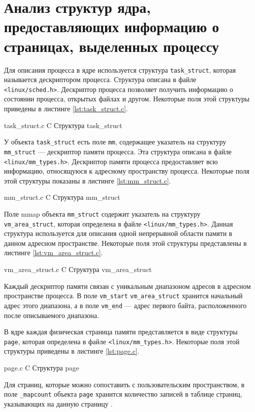 \section{Анализ структур ядра, предоставляющих информацию о страницах, выделенных процессу}

Для описания процесса в ядре используется структура \texttt{task\_struct}, которая называется дескриптором процесса. Структура описана в файле \texttt{<linux/sched.h>}. Дескриптор процесса позволяет получить информацию о состоянии процесса, открытых файлах и другом. Некоторые поля этой структуры приведены в листинге \ref{lst:task_struct.c}.

    {task_struct.c}
    {C}
    {Структура task\_struct}
    
У объекта \texttt{task\_struct} есть поле \texttt{mm}, содержащее указатель на структуру \texttt{mm\_struct} --- дескриптор памяти процесса. Эта структура описана в файле \texttt{<linux/mm\_types.h>}. Дескриптор памяти процесса предоставляет всю информацию, относящуюся к адресному пространству процесса. Некоторые поля этой структуры показаны в листинге \ref{lst:mm_struct.c}.

\newpage

    {mm_struct.c}
    {C}
    {Структура mm\_struct}
    
Поле mmap объекта \texttt{mm\_struct} содержит указатель на структуру \texttt{vm\_area\_struct}, которая определена в файле \texttt{<linux/mm\_types.h>}. Данная структура используется для описания одной непрерывной области памяти в данном адресном пространстве. Некоторые поля этой структуры представлены в листинге \ref{lst:vm_area_struct.c}.
    
    {vm_area_struct.c}
    {C}
    {Структура vm\_area\_struct}

Каждый дескриптор памяти связан с уникальным диапазоном адресов в адресном пространстве процесса. В поле \texttt{vm\_start} \texttt{vm\_area\_struct} хранится начальный адрес этого диапазона, а в поле \texttt{vm\_end} --- адрес первого байта, расположенного после описываемого диапазона.

В ядре каждая физическая страница памяти представляется в виде структуры \texttt{page}, которая определена в файле \texttt{<linux/mm\_types.h>}. Некоторые поля этой структуры приведены в листинге \ref{lst:page.c}.

    {page.c}
    {C}
    {Структура page}

Для страниц, которые можно сопоставить с пользовательским пространством, в поле \texttt{\_mapcount} объекта \texttt{page} хранится количество записей в таблице страниц, указывающих на данную страницу \cite{oracle}.

